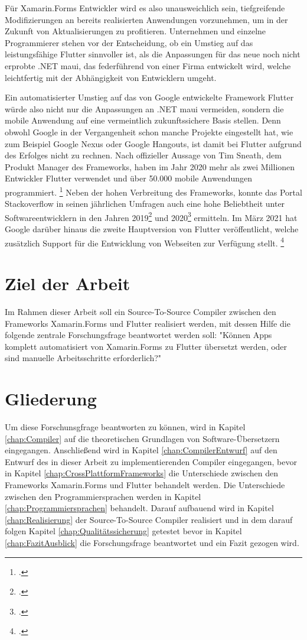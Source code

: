 Für Xamarin.Forms Entwickler wird es also unausweichlich sein,  tiefgreifende Modifizierungen an bereits realisierten Anwendungen vorzunehmen,  um in der Zukunft von Aktualisierungen zu profitieren.  Unternehmen und einzelne Programmierer stehen vor der Entscheidung,  ob ein Umstieg auf das leistungsfähige Flutter sinnvoller ist,  als die Anpassungen für das neue noch nicht erprobte .NET \ac{maui},  das federführend von einer Firma entwickelt wird,  welche leichtfertig mit der Abhängigkeit von Entwicklern umgeht.

Ein automatisierter Umstieg auf das von Google entwickelte Framework Flutter würde also nicht nur die Anpassungen an .NET \ac{maui} vermeiden,  sondern die mobile Anwendung auf eine vermeintlich zukunftssichere Basis stellen.  Denn obwohl Google in der Vergangenheit schon manche Projekte eingestellt hat,  wie zum Beispiel Google Nexus oder Google Hangouts,  ist damit bei Flutter aufgrund des Erfolges nicht zu rechnen.  Nach offizieller Aussage von Tim Sneath, dem Produkt Manager des Frameworks,  haben im Jahr 2020 mehr als zwei Millionen Entwickler Flutter verwendet und über 50.000 mobile Anwendungen programmiert. \footcite[Vgl.][Abgerufen am 28.10.2020]{Sneath2020} Neben der hohen Verbreitung des Frameworks,  konnte das Portal Stackoverflow in seinen jährlichen Umfragen auch eine hohe Beliebtheit unter Softwareentwicklern in den Jahren 2019\footcite[Vgl.][Abgerufen am 28.10.2020]{Stack2019} und 2020\footcite[Vgl.][Abgerufen am 28.10.2020]{Stack2020} ermitteln.  Im März 2021 hat Google darüber hinaus die zweite Hauptversion von Flutter veröffentlicht,  welche zusätzlich Support für die Entwicklung von Webseiten zur Verfügung stellt. \footcite[Vgl.][Abgerufen am 28.10.2020]{GoogleFlutter2}


\section{Ziel der Arbeit}
Im Rahmen dieser Arbeit soll ein Source-To-Source Compiler zwischen den Frameworks Xamarin.Forms und Flutter realisiert werden, mit dessen Hilfe die folgende zentrale Forschungsfrage beantwortet werden soll: "Können Apps komplett automatisiert von Xamarin.Forms zu Flutter übersetzt werden, oder sind manuelle Arbeitsschritte erforderlich?"

\section{Gliederung}
Um diese Forschunsgfrage beantworten zu können, wird in Kapitel \ref{chap:Compiler} auf die theoretischen Grundlagen von Software-Übersetzern eingegangen.  Anschließend wird in Kapitel \ref{chap:CompilerEntwurf} auf den Entwurf des in dieser Arbeit zu implementierenden Compiler eingegangen, bevor in Kapitel \ref{chap:CrossPlattformFrameworks} die Unterschiede zwischen den Frameworks Xamarin.Forms und Flutter behandelt werden.  Die Unterschiede zwischen den Programmiersprachen werden in Kapitel \ref{chap:Programmiersprachen} behandelt. Darauf aufbauend wird in Kapitel \ref{chap:Realisierung} der Source-To-Source Compiler realisiert und in dem darauf folgen Kapitel \ref{chap:Qualitätssicherung} getestet bevor in Kapitel \ref{chap:FazitAusblick} die Forschungsfrage beantwortet und ein Fazit gezogen wird. 